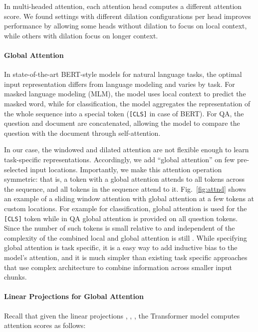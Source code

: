 \documentclass[11pt,a4paper]{article}
\begin{document}
In multi-headed attention, each attention head computes a different attention score.  We found settings with different dilation configurations per head improves performance by allowing some heads without dilation to focus on local context, while others with dilation focus on longer context.



\paragraph{Global Attention} 


In state-of-the-art BERT-style models for natural language tasks, the optimal input representation differs from language modeling and varies by task.
For masked language modeling (MLM), the model uses local context to predict the masked word, while for classification, the model aggregates the representation of the whole sequence into a special token (\texttt{[CLS]} in case of BERT).
For QA, the question and document are concatenated, allowing the model to compare the question with the document through self-attention.






In our case, the windowed and dilated attention are not flexible enough to learn task-specific representations.
Accordingly, we add ``global attention'' on few pre-selected input locations.
Importantly, we make this attention operation symmetric: that is, a token
with a global attention attends to all tokens across the sequence, and all tokens in the sequence attend to it. 
Fig.~\ref{fig:attnd} shows an example of a sliding window attention
with global attention at a few tokens at custom locations. For example for classification, global attention is used for the \texttt{[CLS]} token while in QA global attention is provided on all question tokens.
Since the number of such tokens is small relative to and independent of 
the complexity of the combined local and global attention is still .
While specifying global attention is task specific, it is a easy way to add inductive bias to the model's attention, and it is much simpler than existing task specific approaches that use complex architecture to combine information across smaller input chunks.





\paragraph{Linear Projections for Global Attention}
Recall that given the linear projections , , , the Transformer
model \cite{Vaswani2017AttentionIA} computes attention scores as follows:
\end{document}
